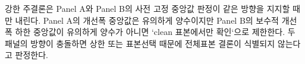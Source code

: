강한 주결론은 Panel A와 Panel B의 사전 고정 중앙값 판정이 같은 방향을
지지할 때만 내린다. Panel A의 개선폭 중앙값은 유의하게 양수이지만 Panel B의
보수적 개선폭 하한 중앙값이 유의하게 양수가 아니면 `clean 표본에서만 확인`으로
제한한다.
두 패널의 방향이 충돌하면 상한 또는 표본선택 때문에 전체표본 결론이 식별되지
않는다고 판정한다.
